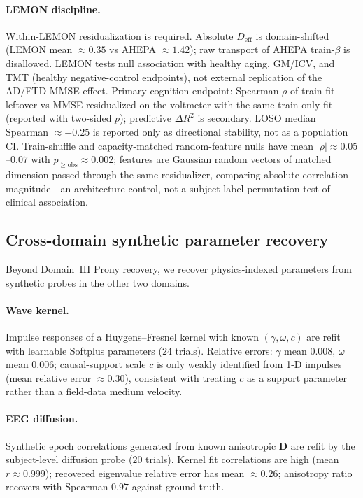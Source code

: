 \documentclass[twocolumn, 10pt]{article}
\begin{document}
\paragraph{LEMON discipline.}
Within-LEMON residualization is required. Absolute \(D_{\mathrm{eff}}\) is domain-shifted (LEMON mean \(\approx0.35\) vs AHEPA \(\approx1.42\)); raw transport of AHEPA train-\(\beta\) is disallowed. LEMON tests null association with healthy aging, GM/ICV, and TMT (healthy negative-control endpoints), not external replication of the AD/FTD MMSE effect. Primary cognition endpoint: Spearman \(\rho\) of train-fit leftover vs MMSE residualized on the voltmeter with the same train-only fit\cite{folstein1975} (reported with two-sided \(p\)); predictive \(\Delta R^{2}\) is secondary. LOSO median Spearman \(\approx-0.25\) is reported only as directional stability, not as a population CI. Train-shuffle and capacity-matched random-feature nulls have mean \(|\rho|\approx0.05\)--\(0.07\) with \(p_{\ge\mathrm{obs}}\approx0.002\); features are Gaussian random vectors of matched dimension passed through the same residualizer, comparing absolute correlation magnitude---an architecture control, not a subject-label permutation test of clinical association.

\subsection*{Cross-domain synthetic parameter recovery}

Beyond Domain~III Prony recovery, we recover physics-indexed parameters from synthetic probes in the other two domains.

\paragraph{Wave kernel.}
Impulse responses of a Huygens--Fresnel kernel with known \((\gamma,\omega,c)\) are refit with learnable Softplus parameters (\(24\) trials). Relative errors: \(\gamma\) mean \(0.008\), \(\omega\) mean \(0.006\); causal-support scale \(c\) is only weakly identified from 1-D impulses (mean relative error \(\approx0.30\)), consistent with treating \(c\) as a support parameter rather than a field-data medium velocity.

\paragraph{EEG diffusion.}
Synthetic epoch correlations generated from known anisotropic \(\mathbf{D}\) are refit by the subject-level diffusion probe (\(20\) trials). Kernel fit correlations are high (mean \(r\approx0.999\)); recovered eigenvalue relative error has mean \(\approx0.26\); anisotropy ratio recovers with Spearman \(0.97\) against ground truth.
\end{document}
